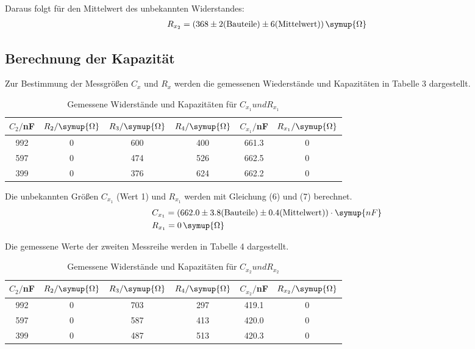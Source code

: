 Daraus folgt für den Mittelwert des unbekannten Widerstandes:
\begin{align*}
  R_{x_2} = (368 \pm 2\text{(Bauteile)} \pm 6\text{(Mittelwert)}) \, \symup{\Omega}
\end{align*}


\subsection{Berechnung der Kapazität}
Zur Bestimmung der Messgrößen $C_x$ und $R_x$ werden die gemessenen Wiederstände und Kapazitäten in
Tabelle 3 dargestellt.

\begin{table}[H]
  \centering
  \caption{Gemessene Widerstände und Kapazitäten für $C_{x_1} und R_{x_1}$}
  \label{tab:Widerstand}
  \begin{tabular}{c c c c c c}
    \toprule
    $C_2/$nF & $R_2/ \symup{\Omega}$ & $R_3/ \symup{\Omega}$ & $R_4 / \symup{\Omega}$ & $C_{x_1}/$nF & $R_{x_1} / \symup{\Omega}$\\
    \midrule
    992 & 0 & 600 & 400 & 661.3  & 0\\
    597 & 0 & 474 & 526 & 662.5  & 0\\
    399 & 0 & 376 & 624 & 662.2  & 0\\
    \bottomrule
  \end{tabular}
\end{table}

Die unbekannten Größen $C_{x_1}$ (Wert 1) und $R_{x_1}$ werden mit Gleichung (6) und (7) berechnet.
\begin{align*}
  &C_{x_1} = (662.0 \pm 3.8\text{(Bauteile)} \pm 0.4\text{(Mittelwert)}) \cdot  \symup{nF} \\
  &R_{x_1} = 0  \, \symup{\Omega}
\end{align*}

Die gemessene Werte der zweiten Messreihe werden in Tabelle 4 dargestellt.

\begin{table}[H]
  \centering
  \caption{Gemessene Widerstände und Kapazitäten für $C_{x_2} und R_{x_2}$}
  \label{tab:Widerstand}
  \begin{tabular}{c c c c c c}
    \toprule
    $C_2/$nF & $R_2/ \symup{\Omega}$ & $R_3/ \symup{\Omega}$ & $R_4 / \symup{\Omega}$ & $C_{x_2}/$nF &  $R_{x_2} / \symup{\Omega}$\\
    \midrule
    992 & 0 & 703 & 297 &  419.1 & 0\\
    597 & 0 & 587 & 413 &  420.0 & 0\\
    399 & 0 & 487 & 513 &  420.3 & 0\\
    \bottomrule
  \end{tabular}
\end{table}

